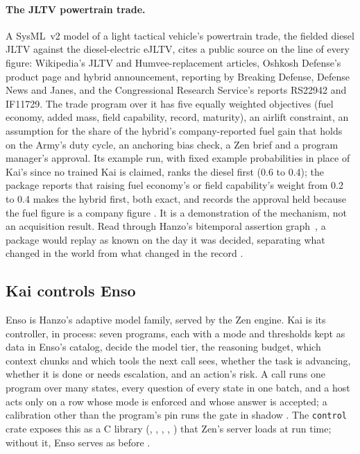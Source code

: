 \paragraph{The JLTV powertrain trade.}
A SysML~v2 model of a light tactical vehicle's powertrain trade, the fielded
diesel JLTV against the diesel-electric eJLTV, cites a public source on the
line of every figure: Wikipedia's JLTV and Humvee-replacement articles,
Oshkosh Defense's product page and hybrid announcement, reporting by Breaking
Defense, Defense News and Janes, and the Congressional Research Service's
reports RS22942 and IF11729. The trade program over it has five equally
weighted objectives (fuel economy, added mass, field capability, record,
maturity), an airlift constraint, an assumption for the share of the hybrid's
company-reported fuel gain that holds on the Army's duty cycle, an anchoring
bias check, a Zen brief and a program manager's approval. Its example run, with
fixed example probabilities in place of Kai's since no trained Kai is claimed,
ranks the diesel first (0.6 to 0.4); the package reports that raising fuel
economy's or field capability's weight from 0.2 to 0.4 makes the hybrid first,
both exact, and records the approval held because the fuel figure is a company
figure \shipped. It is a demonstration of the mechanism, not an acquisition
result. Read through Hanzo's bitemporal assertion graph~\cite{hanzographpaper},
a package would replay as known on the day it was decided, separating what
changed in the world from what changed in the record \proposed.

\subsection{Kai controls Enso}
\label{sec:enso}

Enso is Hanzo's adaptive model family, served by the Zen engine. Kai is its
controller, in process: seven programs, each with a mode and thresholds kept
as data in Enso's catalog, decide the model tier, the reasoning budget, which
context chunks and which tools the next call sees, whether the task is
advancing, whether it is done or needs escalation, and an action's risk. A call
runs one program over many states, every question of every state in one batch,
and a host acts only on a row whose mode is enforced and whose answer is
accepted; a calibration other than the program's pin runs the gate in shadow
\shipped. The \texttt{control} crate exposes this as a C library
(, , , ,
) that Zen's server loads at run time; without it, Enso serves
as before \shipped.

